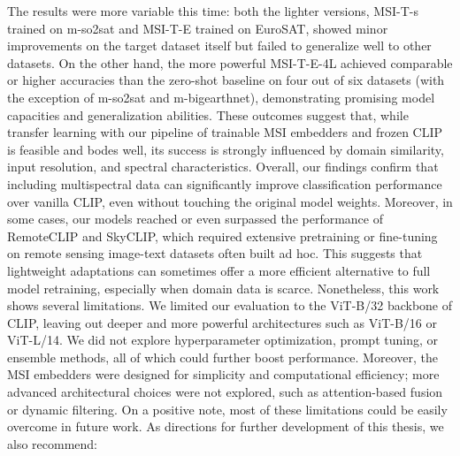 \documentclass[a4paper, oneside, english]{sapthesis} %
\begin{document}
The results were more variable this time: both the lighter versions, MSI-T-s trained on m-so2sat and MSI-T-E trained on EuroSAT, showed minor improvements on the target dataset itself but failed to generalize well to other datasets. On the other hand, the more powerful MSI-T-E-4L achieved comparable or higher accuracies than the zero-shot baseline on four out of six datasets (with the exception of m-so2sat and m-bigearthnet), demonstrating promising model capacities and generalization abilities.
These outcomes suggest that, while transfer learning with our pipeline of trainable MSI embedders and frozen CLIP is feasible and bodes well, its success is strongly influenced by domain similarity, input resolution, and spectral characteristics.
Overall, our findings confirm that including multispectral data can significantly improve classification performance over vanilla CLIP, even without touching the original model weights. Moreover, in some cases, our models reached or even surpassed the performance of RemoteCLIP and SkyCLIP, which required extensive pretraining or fine-tuning on remote sensing image-text datasets often built ad hoc. This suggests that lightweight adaptations can sometimes offer a more efficient alternative to full model retraining, especially when domain data is scarce.
Nonetheless, this work shows several limitations. We limited our evaluation to the ViT-B/32 backbone of CLIP, leaving out deeper and more powerful architectures such as ViT-B/16 or ViT-L/14. We did not explore hyperparameter optimization, prompt tuning, or ensemble methods, all of which could further boost performance. Moreover, the MSI embedders were designed for simplicity and computational efficiency; more advanced architectural choices were not explored, such as attention-based fusion or dynamic filtering. On a positive note, most of these limitations could be easily overcome in future work. 
As directions for further development of this thesis, we also recommend:
\end{document}

